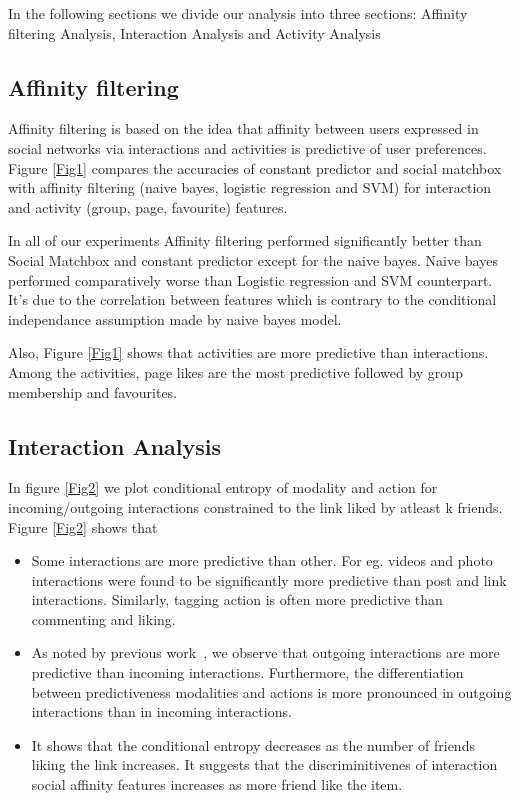 In the following sections we divide our analysis into three sections: 
Affinity filtering Analysis, Interaction Analysis and Activity Analysis
\subsection{Affinity filtering}
Affinity filtering is based on the idea that affinity between users expressed in social networks via interactions and activities is predictive 
of user preferences. Figure \ref{Fig1} compares the accuracies of constant predictor and social matchbox with affinity filtering (naive bayes,
logistic regression and SVM) for interaction and activity (group, page, favourite) features. 

In all of our experiments Affinity filtering performed significantly better than Social Matchbox and constant predictor except for the naive bayes.
Naive bayes performed comparatively worse than Logistic regression and SVM counterpart. It's  due to the correlation between features which is contrary to the
conditional independance assumption made by naive bayes model.

Also, Figure \ref{Fig1} shows that activities are more predictive than interactions. Among the activities, page likes are the most predictive followed by group
membership and favourites.

\subsection{Interaction Analysis}
In figure \ref{Fig2} we plot conditional entropy of modality and action for incoming/outgoing interactions constrained to the link liked by atleast k friends.
Figure \ref{Fig2} shows that 
\begin{itemize}
  \item Some interactions are more predictive than other. For eg. videos and photo interactions were found to be significantly more predictive than post
  		and link interactions. Similarly, tagging action is often more predictive than commenting and liking. 
  \item As noted by previous work~\cite{saez2011high}, we observe that outgoing interactions are more predictive than incoming interactions. Furthermore, the differentiation between 
  		predictiveness modalities and actions is more pronounced in outgoing interactions than in incoming interactions.
  \item It shows that the conditional entropy decreases as the number of friends liking the link increases.
        It suggests that the discriminitivenes of interaction social affinity features increases as more friend like the item.   
  \end{itemize}

